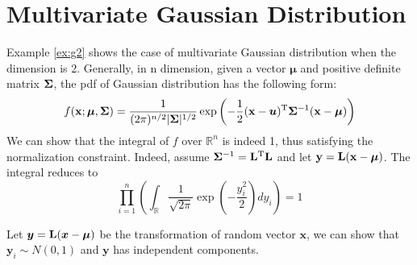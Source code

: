 \section{Multivariate Gaussian Distribution}
Example \ref{ex:g2} shows the case of multivariate Gaussian distribution when the dimension is 2. Generally, in n dimension, given a vector $\bm{\mu}$ and positive definite matrix $\mathbf{\Sigma}$, the pdf of Gaussian distribution has the following form:
\begin{equation}
f(\mathbf{x}; \bm{\mu}, \mathbf{\Sigma}) = \frac{1}{(2\pi)^{n/2} \lvert\mathbf{\Sigma}\rvert^{1/2}} \exp \left(-\frac{1}{2} (\mathbf{x} - \bm{u})^{\mathrm{T}} \mathbf{\Sigma}^{-1} (\mathbf{x} - \bm{\mu})\right)
\end{equation}
We can show that the integral of $f$ over $\mathbb{R}^n$ is indeed 1, thus satisfying the normalization constraint. Indeed, assume $\mathbf{\Sigma}^{-1} = \mathbf{L}^{\mathrm{T}} \mathbf{L}$ and let $\mathbf{y} = \mathbf{L} (\mathbf{x} - \bm{\mu})$. The integral reduces to
$$
\prod_{i=1}^n \left(\int_{\mathbb{R}}\frac{1}{\sqrt{2\pi}} \exp(-\frac{y^2_i}{2}) dy_i\right) = 1
$$

Let $\bm{y} = \mathbf{L} (\bm{x} - \bm{\mu})$ be the transformation of random vector $\bm{x}$, we can show that $\bm{y}_i \sim N(0, 1)$ and $\bm{y}$ has independent components.  